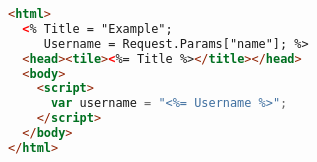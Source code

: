 {\ssp
\begin{lstlisting}[language=aspx, caption=Example of a simple ASP.NET Web Form page., label=code:simple-aspx, float]
<html>
  <% Title = "Example";
	 Username = Request.Params["name"]; %>
  <head><tile><%= Title %></title></head>
  <body>
    <script>
      var username = "<%= Username %>";
    </script>
  </body>
</html>
\end{lstlisting}
}
